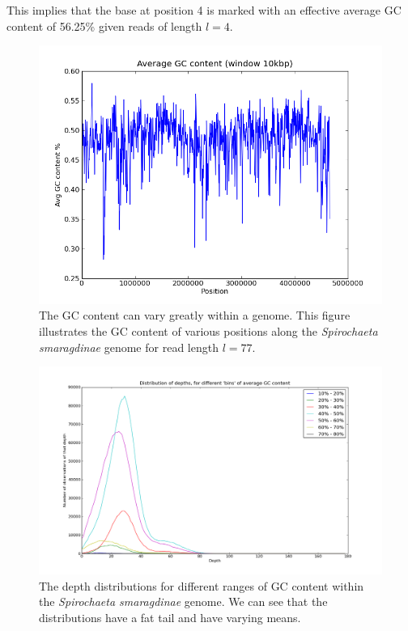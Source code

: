 \documentclass[phd,tocprelim]{cornell}
\begin{document}
This implies that the base at position 4 is marked with an effective average GC content of 56.25\% given reads of length $l=4$.

\begin{figure}[hptb]
    \centerline{\includegraphics[width=\textwidth]{figures/ALE/spiroGC.png}}
    \caption[GC content of {\it Spirochaeta smaragdinae}]{The GC content can vary greatly within a genome. This figure illustrates the GC content of various positions along the {\it Spirochaeta smaragdinae} genome for read length $l=77$.}\label{fig:GC2}
\end{figure}

\begin{figure}[hptb]
    \centerline{\includegraphics[width=\textwidth]{figures/ALE/DepthDistVsGC_564lib.png}}
    \caption[Depth distribution of different GC contents]{The depth distributions for different ranges of GC content within the {\it Spirochaeta smaragdinae} genome. We can see that the distributions have a fat tail and have varying means.}\label{fig:GC3}
\end{figure}
\end{document}
